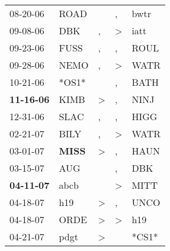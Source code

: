 \begin{supertabular}{p{0.07\textwidth}p{0.06\textwidth}p{0.02\textwidth}p{0.02\textwidth}p{0.06\textwidth}}
          08-20-06\textsuperscript{} &           ROAD\textsuperscript{} &                  &                , &           bwtr\textsuperscript{} \\
          09-08-06\textsuperscript{} &            DBK\textsuperscript{} &                , &     \textgreater &           iatt\textsuperscript{} \\
          09-23-06\textsuperscript{} &           FUSS\textsuperscript{} &                , &                , &           ROUL\textsuperscript{} \\
          09-28-06\textsuperscript{} &           NEMO\textsuperscript{} &                , &     \textgreater &           WATR\textsuperscript{} \\
          10-21-06\textsuperscript{} &                            *OS1* &                  &                , &           BATH\textsuperscript{} \\
 \textbf{11-16-06\textsuperscript{}} &           KIMB\textsuperscript{} &     \textgreater &                , &           NINJ\textsuperscript{} \\
          12-31-06\textsuperscript{} &           SLAC\textsuperscript{} &                , &                , &           HIGG\textsuperscript{} \\
          02-21-07\textsuperscript{} &           BILY\textsuperscript{} &                , &     \textgreater &           WATR\textsuperscript{} \\
          03-01-07\textsuperscript{} &  \textbf{MISS\textsuperscript{}} &     \textgreater &                , &           HAUN\textsuperscript{} \\
          03-15-07\textsuperscript{} &            AUG\textsuperscript{} &                  &                , &            DBK\textsuperscript{} \\
 \textbf{04-11-07\textsuperscript{}} &           abcb\textsuperscript{} &                  &     \textgreater &           MITT\textsuperscript{} \\
          04-18-07\textsuperscript{} &            h19\textsuperscript{} &     \textgreater &                , &           UNCO\textsuperscript{} \\
          04-18-07\textsuperscript{} &           ORDE\textsuperscript{} &     \textgreater &     \textgreater &            h19\textsuperscript{} \\
          04-21-07\textsuperscript{} &           pdgt\textsuperscript{} &     \textgreater &                  &                            *CS1* \\

\end{supertabular}
